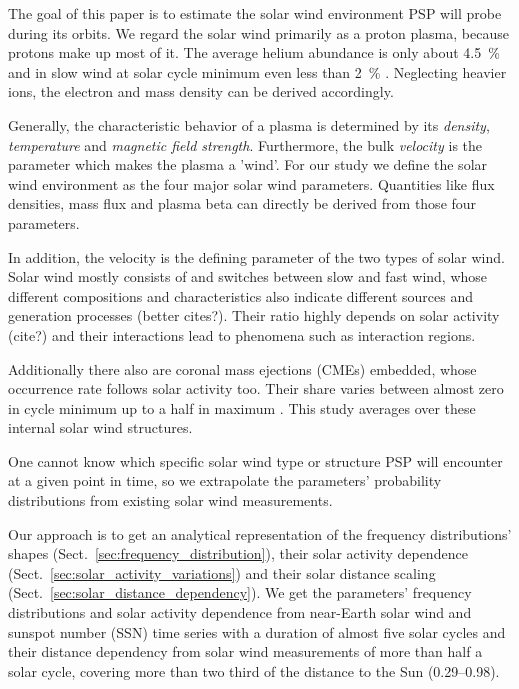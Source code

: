 The goal of this paper is to estimate the solar wind environment PSP will probe during its orbits. We regard the solar wind primarily as a proton plasma, because protons make up most of it. The average helium abundance is only about \SI{4.5}{\percent} and in slow wind at solar cycle minimum even less than \SI{2}{\percent} \citep{Feldman1978,Schwenn1983,Kasper2012}. Neglecting heavier ions, the electron and mass density can be derived accordingly.

Generally, the characteristic behavior of a plasma is determined by its \textit{density}, \textit{temperature} and \textit{magnetic field strength}. Furthermore, the bulk \textit{velocity} is the parameter which makes the plasma a 'wind'. For our study we define the solar wind environment as the four major solar wind parameters. Quantities like flux densities, mass flux and plasma beta can directly be derived from those four parameters.

In addition, the velocity is the defining parameter of the two types of solar wind. Solar wind mostly consists of and switches between slow and fast wind, whose different compositions and characteristics also indicate different sources and generation processes \citep{McGregor2011a} (better cites?). Their ratio highly depends on solar activity (cite?) and their interactions lead to phenomena such as interaction regions.

Additionally there also are coronal mass ejections (CMEs) embedded, whose occurrence rate follows solar activity too. Their share varies between almost zero in cycle minimum up to a half in maximum \citep{Richardson2012}. This study averages over these internal solar wind structures.

One cannot know which specific solar wind type or structure PSP will encounter at a given point in time, so we extrapolate the parameters' probability distributions from existing solar wind measurements.

Our approach is to get an analytical representation of the frequency distributions' shapes (Sect.~\ref{sec:frequency_distribution}), their solar activity dependence (Sect.~\ref{sec:solar_activity_variations}) and their solar distance scaling (Sect.~\ref{sec:solar_distance_dependency}). We get the parameters' frequency distributions and solar activity dependence from near-Earth solar wind and sunspot number (SSN) time series with a duration of almost five solar cycles and their distance dependency from solar wind measurements of more than half a solar cycle, covering more than two third of the distance to the Sun (\SIrange{0.29}{0.98}{\au}).%

